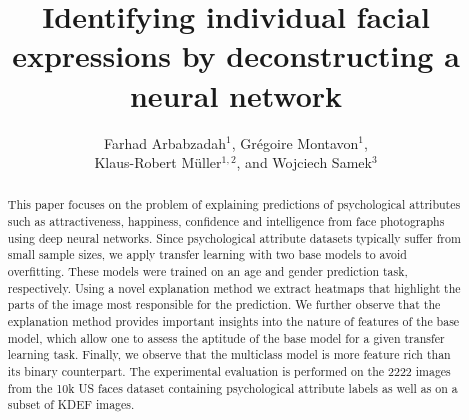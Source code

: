 \documentclass[runningheads]{llncs}
\begin{document}
\pagestyle{headings}
\mainmatter
\def\GCPR16SubNumber{85}
\title{Identifying individual facial expressions by deconstructing a neural network}
\author{Farhad Arbabzadah$^1$, Gr{\'e}goire Montavon$^1$,\\ Klaus-Robert M{\"u}ller$^{1,2}$, and Wojciech Samek$^3$}
\maketitle

\begin{abstract}
This paper focuses on the problem of explaining predictions of psychological attributes such as attractiveness, happiness, confidence and intelligence from face photographs using deep neural networks. Since psychological attribute datasets typically suffer from small sample sizes, we apply transfer learning with two base models to avoid overfitting. These models were trained on an age and gender prediction task, respectively. Using a novel explanation method we extract heatmaps that highlight the parts of the image most responsible for the prediction. We further observe that the explanation method provides important insights into the nature of features of the base model, which allow one to assess the aptitude of the base model for a given transfer learning task. Finally, we observe that the multiclass model is more feature rich than its binary counterpart. The experimental evaluation is performed on the 2222 images from the 10k US faces dataset containing psychological attribute labels as well as on a subset of KDEF images.
\end{abstract}
\end{document}

